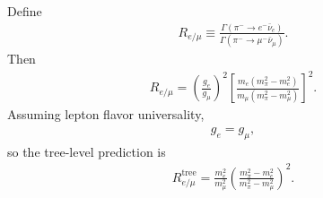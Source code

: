 Define
\begin{align}
R_{e/\mu}
\equiv
\frac{
\Gamma(\pi^- \to e^- \bar{\nu}_e)
}{
\Gamma(\pi^- \to \mu^- \bar{\nu}_\mu)
}.
\end{align}
Then
\begin{align}
R_{e/\mu}
=
\left(
\frac{g_e}{g_\mu}
\right)^2
\left[
\frac{
m_e(m_\pi^2-m_e^2)
}{
m_\mu(m_\pi^2-m_\mu^2)
}
\right]^2 .
\end{align}
Assuming lepton flavor universality,
\begin{align}
g_e = g_\mu ,
\end{align}
so the tree-level prediction is
\begin{align}
R_{e/\mu}^{\mathrm{tree}}
=
\frac{m_e^2}{m_\mu^2}
\left(
\frac{m_\pi^2-m_e^2}
     {m_\pi^2-m_\mu^2}
\right)^2 .
\end{align}
